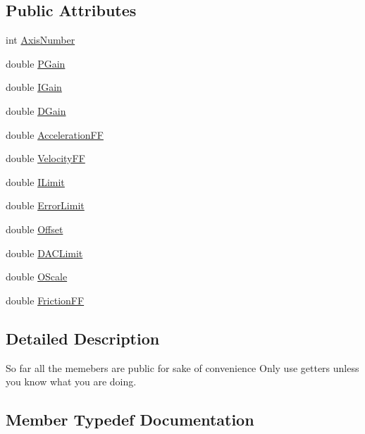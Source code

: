 \subsection*{Public Attributes}
\begin{DoxyCompactItemize}
\item 
int \hyperlink{classprm_gain_parameters_adfd1fc26fefbbca5905b842ba21ef5e5}{Axis\+Number}
\item 
double \hyperlink{classprm_gain_parameters_a60f5eb4771e850faf09e1adc277a9212}{P\+Gain}
\item 
double \hyperlink{classprm_gain_parameters_a91f63a293f7909483f494940eb1d670a}{I\+Gain}
\item 
double \hyperlink{classprm_gain_parameters_abee35d41aaebd76b9a496d801b5d6e0e}{D\+Gain}
\item 
double \hyperlink{classprm_gain_parameters_a0a99dca73c166449c7c1faa7f3772a4a}{Acceleration\+F\+F}
\item 
double \hyperlink{classprm_gain_parameters_a331e5f1371acaf30e54f13e0e243aa0a}{Velocity\+F\+F}
\item 
double \hyperlink{classprm_gain_parameters_acd427789e5a948a9fb4ebbcc6e6d9ff4}{I\+Limit}
\item 
double \hyperlink{classprm_gain_parameters_aa15f34c2aa2670d0476950d87579b826}{Error\+Limit}
\item 
double \hyperlink{classprm_gain_parameters_a32c8ddbf1415970e0f77d53bf48e6274}{Offset}
\item 
double \hyperlink{classprm_gain_parameters_a0b3cf9565acad495fb3fc0b82a97ab4d}{D\+A\+C\+Limit}
\item 
double \hyperlink{classprm_gain_parameters_ab99c3badf541dcb2ed494281917cd9df}{O\+Scale}
\item 
double \hyperlink{classprm_gain_parameters_ae30ef66f5c7b7172cabd23696b3d222a}{Friction\+F\+F}
\end{DoxyCompactItemize}


\subsection{Detailed Description}
So far all the memebers are public for sake of convenience Only use getters unless you know what you are doing. 

\subsection{Member Typedef Documentation}
\hypertarget{classprm_gain_parameters_ac13e32cd34eafe7bd371cf0fe7735838}{}
